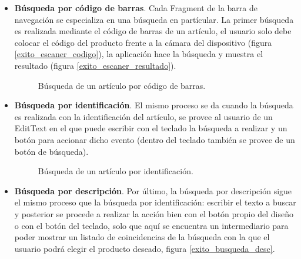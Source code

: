 \begin{itemize}
	\item \textbf{Búsqueda por código de barras}. Cada Fragment de la barra de navegación se especializa en una búsqueda en partícular. La primer búsqueda es realizada mediante el código de barras de un artículo, el usuario solo debe colocar el código del producto frente a la cámara del dispositivo (figura \ref{exito_escaner_codigo}), la aplicación hace la búsqueda y muestra el resultado (figura \ref{exito_escaner_resultado}). \\

		\begin{figure}[!h]
			\centering
			\caption{Búsqueda de un artículo por código de barras.}
			\label{exito_escaner}
		\end{figure}
	
	\item \textbf{Búsqueda por identificación}. El mismo proceso se da cuando la búsqueda es realizada con la identificación del artículo, se provee al usuario de un EditText en el que puede escribir con el teclado la búsqueda a realizar y un botón para accionar dicho evento (dentro del teclado también se provee de un botón de búsqueda).\\

		\begin{figure}[!h]
			\centering
			\caption{Búsqueda de un artículo por identificación.}
			\label{exito_busquedaid}
		\end{figure}

	\item \textbf{Búsqueda por descripción}. Por último, la búsqueda por descripción sigue el mismo proceso que la búsqueda por identificación: escribir el texto a buscar y posterior se procede a realizar la acción bien con el botón propio del diseño o con el botón del teclado, solo que aquí se encuentra un intermediario para poder mostrar un listado de coincidencias de la búsqueda con la que el usuario podrá elegir el producto deseado, figura \ref{exito_busqueda_desc}.\\
	

\end{itemize}
